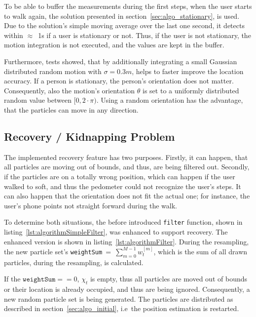 To be able to buffer the measurements during the first steps, when the user starts to walk again, the solution presented in section~\ref{sec:algo_stationary}, is used. Due to the solution's simple moving average over the last one second, it detects within $\approx$~1s if a user is stationary or not. Thus, if the user is not stationary, the motion integration is not executed, and the values are kept in the buffer.

Furthermore, tests showed, that by additionally integrating a small Gaussian distributed random motion with $\sigma = 0.3m$, helps to faster improve the location accuracy. If a person is stationary, the person's orientation does not matter. Consequently, also the motion's orientation $\theta$ is set to a uniformly distributed random value between $[0, 2 \cdot \pi)$. Using a random orientation has the advantage, that the particles can move in any direction.




\subsection{Recovery / Kidnapping Problem}\label{sec:algo_recovery}
The implemented recovery feature has two purposes. Firstly, it can happen, that all particles are moving out of bounds, and thus, are being filtered out. Secondly, if the particles are on a totally wrong position, which can happen if the user walked to soft, and thus the pedometer could not recognize the user's steps. It can also happen that the orientation does not fit the actual one; for instance, the user's phone points not straight forward during the walk.

To determine both situations, the before introduced \texttt{filter} function, shown in listing~\ref{lst:algorithmSimpleFilter}, was enhanced to support recovery. The enhanced version is shown in listing~\ref{lst:algorithmFilter}. During the resampling, the new particle set's \texttt{weightSum}~=~$\sum_{m = 0}^{M-1} w^{[m]}_t$, which is the sum of all drawn particles, during the resampling, is calculated.

If the $\texttt{weightSum} == 0$, $\chi_t$ is empty, thus all particles are moved out of bounds or their location is already occupied, and thus are being ignored. Consequently, a new random particle set is being generated. The particles are distributed as described in section~\ref{sec:algo_initial}, i.e\ the position estimation is restarted.

